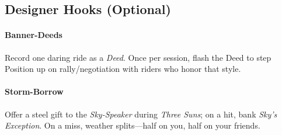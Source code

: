 \subsection*{Designer Hooks (Optional)}

\paragraph{Banner-Deeds}
Record one daring ride as a \emph{Deed}. Once per session, flash the Deed to step Position up on rally/negotiation with riders who honor that style.

\paragraph{Storm-Borrow}
Offer a steel gift to the \emph{Sky-Speaker} during \emph{Three Suns}; on a hit, bank \emph{Sky’s Exception}. On a miss, weather splits—half on you, half on your friends.
